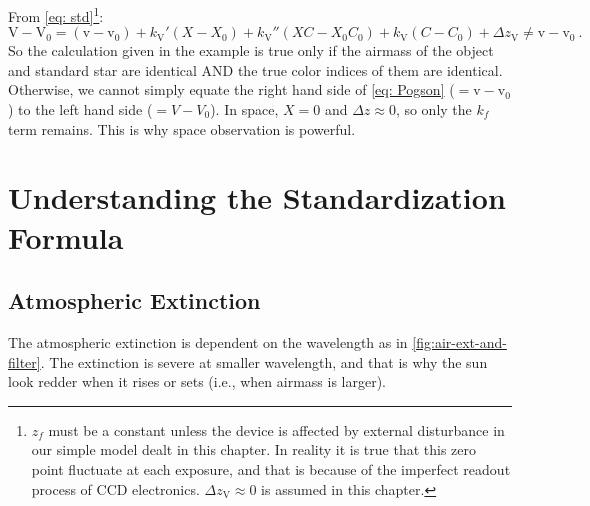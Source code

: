
From \cref{eq: std}\footnote{$ z_{f} $ must be a constant unless the device is affected by external disturbance in our simple model dealt in this chapter. In reality it is true that this zero point fluctuate at each exposure, and that is because of the imperfect readout process of CCD electronics. $ \Delta z_\mathrm{V} \approx 0 $ is assumed in this chapter.}:
\begin{equation}
  \mathrm{V} - \mathrm{V}_0 
    = (\mathrm{v} - \mathrm{v}_0)
    + k_\mathrm{V}'(X - X_0)
    + k_\mathrm{V}''(X C - X_0 C_0)
    + k_\mathrm{V}(C - C_0)
    + \Delta z_\mathrm{V}
    \neq \mathrm{v} - \mathrm{v}_0 ~.
\end{equation}
So the calculation given in the example is true only if the airmass of the object and standard star are identical AND the true color indices of them are identical. Otherwise, we cannot simply equate the right hand side of \cref{eq: Pogson} ($ = \mathrm{v} - \mathrm{v}_0 $) to the left hand side ($ = V - V_0 $). In space, $ X = 0 $ and $ \Delta z \approx 0 $, so only the $ k_f $ term remains. This is why space observation is powerful.

\section{Understanding the Standardization Formula}

\subsection{Atmospheric Extinction}
The atmospheric extinction is dependent on the wavelength as in \cref{fig:air-ext-and-filter}. The extinction is severe at smaller wavelength, and that is why the sun look redder when it rises or sets (i.e., when airmass is larger). 

